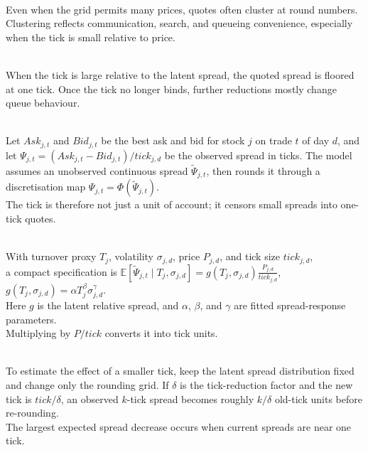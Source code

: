 \documentclass[a4paper,oneside,openany]{book}
\begin{document}
\begin{empiricalfinding} \\
Even when the grid permits many prices, quotes often cluster at round numbers. Clustering reflects communication, search, and queueing convenience, especially when the tick is small relative to price.
\end{empiricalfinding}

\begin{mechanism} \\
When the tick is large relative to the latent spread, the quoted spread is floored at one tick. Once the tick no longer binds, further reductions mostly change queue behaviour.
\end{mechanism}

\begin{model} \\
Let $Ask_{j,t}$ and $Bid_{j,t}$ be the best ask and bid for stock $j$ on trade $t$ of day $d$, and let $\Psi_{j,t}=(Ask_{j,t}-Bid_{j,t})/tick_{j,d}$ be the observed spread in ticks. The model assumes an unobserved continuous spread $\widetilde{\Psi}_{j,t}$, then rounds it through a discretisation map $\Psi_{j,t}=\Phi(\widetilde{\Psi}_{j,t})$.\\
The tick is therefore not just a unit of account; it censors small spreads into one-tick quotes.
\end{model}

\begin{definition} \\
With turnover proxy $T_j$, volatility $\sigma_{j,d}$, price $P_{j,d}$, and tick size $tick_{j,d}$,\\
a compact specification is $\mathbb{E}[\widetilde{\Psi}_{j,t}\mid T_j,\sigma_{j,d}] =g(T_j,\sigma_{j,d})\frac{P_{j,d}}{tick_{j,d}}$, $g(T_j,\sigma_{j,d})=\alpha T_j^\beta\sigma_{j,d}^{\gamma}$.\\
Here $g$ is the latent relative spread, and $\alpha$, $\beta$, and $\gamma$ are fitted spread-response parameters.\\
Multiplying by $P/tick$ converts it into tick units.
\end{definition}

\begin{mechanism} \\
To estimate the effect of a smaller tick, keep the latent spread distribution fixed and change only the rounding grid. If $\delta$ is the tick-reduction factor and the new tick is $tick/\delta$, an observed $k$-tick spread becomes roughly $k/\delta$ old-tick units before re-rounding.\\
The largest expected spread decrease occurs when current spreads are near one tick.
\end{mechanism}
\end{document}

